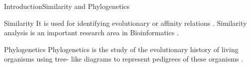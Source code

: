 \documentclass[10pt]{beamer}
\newcommand{\1}{
	\setbeamertemplate{background}{
		\texttt{[image: img/1\_dna]}
		\tikz[overlay] \fill[fill opacity=0.75,fill=white] (0,0) rectangle (-\paperwidth,\paperheight);
	}
}
\begin{document}


\begin{frame}{Introduction}{Similarity and Phylogenetics}
	\begin{block}{Similarity}
		It is used for identifying evolutionary or affinity relations \cite{delibacs2020dna}. Similarity analysis is an important research area in Bioinformatics \cite{jin2017similarity}.
	\end{block}
	
	\begin{block}{Phylogenetics}
		Phylogenetics is the study of the evolutionary history of living organisms using tree-
		like diagrams to represent pedigrees of these organisms \cite{xiong2006essential}.
	\end{block}
\end{frame}



\end{document}
